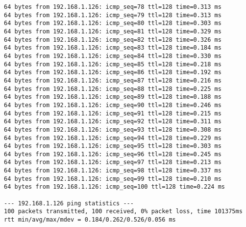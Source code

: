 \begin{lstlisting}[frame=single, caption={The Ping test without OVS}, label={lst:Pingtest_no_OVS}]
64 bytes from 192.168.1.126: icmp_seq=78 ttl=128 time=0.313 ms
64 bytes from 192.168.1.126: icmp_seq=79 ttl=128 time=0.313 ms
64 bytes from 192.168.1.126: icmp_seq=80 ttl=128 time=0.303 ms
64 bytes from 192.168.1.126: icmp_seq=81 ttl=128 time=0.329 ms
64 bytes from 192.168.1.126: icmp_seq=82 ttl=128 time=0.326 ms
64 bytes from 192.168.1.126: icmp_seq=83 ttl=128 time=0.184 ms
64 bytes from 192.168.1.126: icmp_seq=84 ttl=128 time=0.330 ms
64 bytes from 192.168.1.126: icmp_seq=85 ttl=128 time=0.218 ms
64 bytes from 192.168.1.126: icmp_seq=86 ttl=128 time=0.192 ms
64 bytes from 192.168.1.126: icmp_seq=87 ttl=128 time=0.216 ms
64 bytes from 192.168.1.126: icmp_seq=88 ttl=128 time=0.225 ms
64 bytes from 192.168.1.126: icmp_seq=89 ttl=128 time=0.188 ms
64 bytes from 192.168.1.126: icmp_seq=90 ttl=128 time=0.246 ms
64 bytes from 192.168.1.126: icmp_seq=91 ttl=128 time=0.215 ms
64 bytes from 192.168.1.126: icmp_seq=92 ttl=128 time=0.311 ms
64 bytes from 192.168.1.126: icmp_seq=93 ttl=128 time=0.308 ms
64 bytes from 192.168.1.126: icmp_seq=94 ttl=128 time=0.229 ms
64 bytes from 192.168.1.126: icmp_seq=95 ttl=128 time=0.303 ms
64 bytes from 192.168.1.126: icmp_seq=96 ttl=128 time=0.245 ms
64 bytes from 192.168.1.126: icmp_seq=97 ttl=128 time=0.213 ms
64 bytes from 192.168.1.126: icmp_seq=98 ttl=128 time=0.337 ms
64 bytes from 192.168.1.126: icmp_seq=99 ttl=128 time=0.210 ms
64 bytes from 192.168.1.126: icmp_seq=100 ttl=128 time=0.224 ms

--- 192.168.1.126 ping statistics ---
100 packets transmitted, 100 received, 0% packet loss, time 101375ms
rtt min/avg/max/mdev = 0.184/0.262/0.526/0.056 ms

\end{lstlisting}

